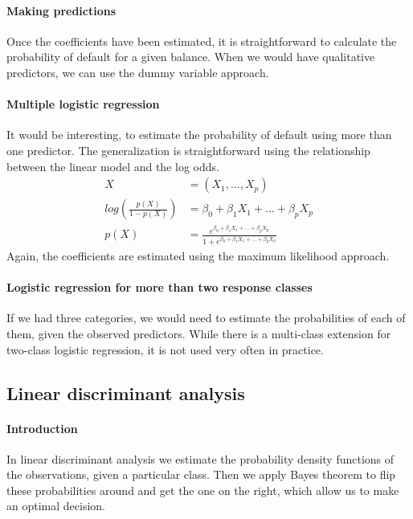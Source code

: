 \documentclass[../document.tex]{subfiles}
\begin{document}
	\paragraph{Making predictions}
	Once the coefficients have been estimated, it is straightforward to calculate the probability of default for a given balance. When we would have qualitative predictors, we can use the dummy variable approach.
	\paragraph{Multiple logistic regression}
	It would be interesting, to estimate the probability of default using more than one predictor. The generalization is straightforward using the relationship between the linear model and the log odds.
	\begin{equation}
	\begin{split}
		X &= (X_{1},...,X_{p})\\
		log(\frac{p(X)}{1-p(X)})&=\beta_{0}+\beta_{1}X_{1}+...+\beta_{p}X_{p}\\
		p(X)&=\frac{e^{\beta_{0}+\beta_{1}X_{1}+...+\beta_{p}X_{p}}}{1+e^{\beta_{0}+\beta_{1}X_{1}+...+\beta_{p}X_{p}}}
	\end{split}
	\end{equation}
	Again, the coefficients are estimated using the maximum likelihood approach.
	\paragraph{Logistic regression for more than two response classes}
	If we had three categories, we would need to estimate the probabilities of each of them, given the observed predictors. While there is a multi-class extension for two-class logistic regression, it is not used very often in practice.
	\subsection{Linear discriminant analysis}
	\paragraph{Introduction}
	In linear discriminant analysis we estimate the probability density functions of the observations, given a particular class. Then we apply Bayes theorem to flip these probabilities around and get the one on the right, which allow us to make an optimal decision.
\end{document}
